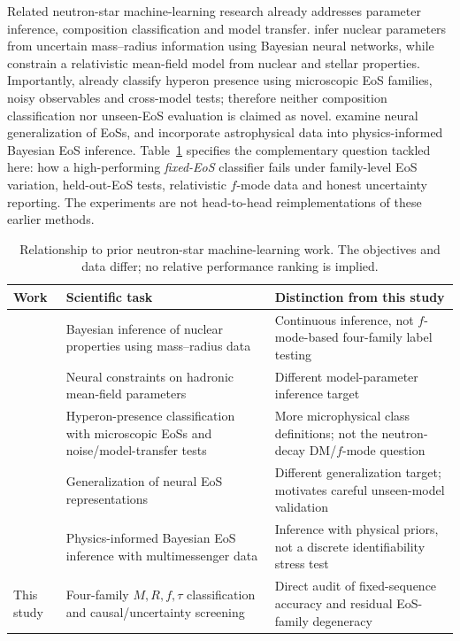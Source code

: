 \documentclass[11pt,a4paper]{article}
\begin{document}
Related neutron-star machine-learning research already addresses parameter inference, composition classification and model transfer. \citet{Carvalho24MR} infer nuclear parameters from uncertain mass--radius information using Bayesian neural networks, while \citet{Guo24} constrain a relativistic mean-field model from nuclear and stellar properties. Importantly, \citet{Carvalho24Hyp} already classify hyperon presence using microscopic EoS families, noisy observables and cross-model tests; therefore neither composition classification nor unseen-EoS evaluation is claimed as novel. \citet{Goncalves25} examine neural generalization of EoSs, and \citet{Baker26} incorporate astrophysical data into physics-informed Bayesian EoS inference. Table~\ref{tab:priorwork} specifies the complementary question tackled here: how a high-performing \emph{fixed-EoS} classifier fails under family-level EoS variation, held-out-EoS tests, relativistic $f$-mode data and honest uncertainty reporting. The experiments are not head-to-head reimplementations of these earlier methods.

\begin{table}[t]\centering\scriptsize
\caption{Relationship to prior neutron-star machine-learning work. The objectives and data differ; no relative performance ranking is implied.}\label{tab:priorwork}
\begin{tabular}{>{\raggedright\arraybackslash}p{}>{\raggedright\arraybackslash}p{}>{\raggedright\arraybackslash}p{}}\toprule
Work & Scientific task & Distinction from this study\\\midrule
\citet{Carvalho24MR} & Bayesian inference of nuclear properties using mass--radius data & Continuous inference, not $f$-mode-based four-family label testing\\
\citet{Guo24} & Neural constraints on hadronic mean-field parameters & Different model-parameter inference target\\
\citet{Carvalho24Hyp} & Hyperon-presence classification with microscopic EoSs and noise/model-transfer tests & More microphysical class definitions; not the neutron-decay DM/$f$-mode question\\
\citet{Goncalves25} & Generalization of neural EoS representations & Different generalization target; motivates careful unseen-model validation\\
\citet{Baker26} & Physics-informed Bayesian EoS inference with multimessenger data & Inference with physical priors, not a discrete identifiability stress test\\
This study & Four-family $M,R,f,\tau$ classification and causal/uncertainty screening & Direct audit of fixed-sequence accuracy and residual EoS-family degeneracy\\\bottomrule
\end{tabular}\end{table}
\end{document}
